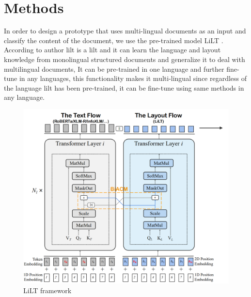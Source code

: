 \chapter{Methods \label{Chapter_Methods}}
In order to design a prototype that uses multi-lingual documents as an input and classify the content of the document, we use the pre-trained model LiLT  \cite{wang-etal-2022-lilt}. According to author \cite{wang-etal-2022-lilt} \acrshort{lilt} is a \acrlong{lilt} and it can learn the language and layout knowledge from monolingual structured documents and generalize it to deal with multilingual documents, It can be pre-trained in one language and further fine-tune in any languages, this functionality makes it multi-lingual since regardless of the language \acrshort{lilt} has been pre-trained, it can be fine-tune using same methods in any language.


\begin{figure}[!ht]
    \centering
    \includegraphics[width=1\textwidth]{chapters/images/Methods/Proposed Model/new_lilt_framework.png}
    \caption{LiLT framework \cite{wang-etal-2022-lilt}}
    \label{fig:lilt_framework}
\end{figure}

